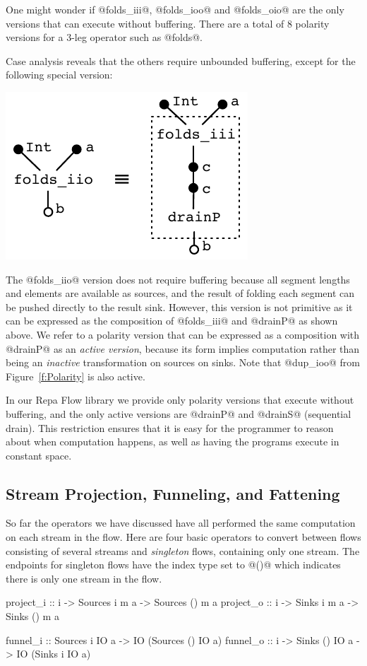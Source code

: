 One might wonder if @folds_iii@, @folds_ioo@ and @folds_oio@ are the only versions that can execute without buffering. There are a total of 8 polarity versions for a 3-leg operator such as @folds@.

\eject
Case analysis reveals that the others require unbounded buffering, except for the following special version:
\begin{center}
\includegraphics[scale=0.8]{figures/folds-drain.pdf}
\end{center}

The @folds_iio@ version does not require buffering because all segment lengths and elements are available as sources, and the result of folding each segment can be pushed directly to the result sink. However, this version is not primitive as it can be expressed as the composition of @folds_iii@ and @drainP@ as shown above. We refer to a polarity version that can be expressed as a composition with @drainP@ as an \emph{active version}, because its form implies computation rather than being an \emph{inactive} transformation on sources on sinks. Note that @dup_ioo@ from Figure~\ref{f:Polarity} is also active.

In our Repa Flow library we provide only polarity versions that execute without buffering, and the only active versions are @drainP@ and @drainS@ (sequential drain). This restriction ensures that it is easy for the programmer to reason about when computation happens, as well as having the programs execute in constant space.


\subsection{Stream Projection, Funneling, and Fattening}
So far the operators we have discussed have all performed the same computation on each stream in the flow. Here are four basic operators to convert between flows consisting of several streams and \emph{singleton} flows, containing only one stream. The endpoints for singleton flows have the index type set to @()@ which indicates there is only one stream in the flow.
\begin{code}
project_i :: i -> Sources i m a -> Sources () m a
project_o :: i -> Sinks   i m a -> Sinks   () m a

funnel_i :: Sources i IO a ->  IO (Sources () IO a)
funnel_o :: i -> Sinks () IO a -> IO (Sinks i IO a)
\end{code}

